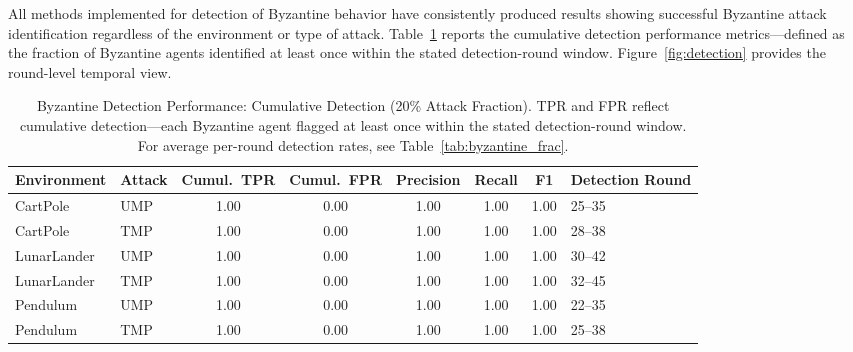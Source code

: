 \documentclass[12pt,a4paper]{article}
\begin{document}
All methods implemented for detection of Byzantine behavior have consistently produced
results showing successful Byzantine attack identification regardless of the environment
or type of attack. Table~\ref{tab:detection} reports the cumulative detection
performance metrics---defined as the fraction of Byzantine agents identified at least
once within the stated detection-round window. Figure~\ref{fig:detection} provides the
round-level temporal view.

\begin{table}[htbp]
\centering
\caption{Byzantine Detection Performance: Cumulative Detection (20\% Attack Fraction). TPR and FPR reflect cumulative detection---each Byzantine agent flagged at least once within the stated detection-round window. For average per-round detection rates, see Table~\ref{tab:byzantine_frac}.}
\label{tab:detection}
\begin{tabular}{llcccccl}
\toprule
\textbf{Environment} & \textbf{Attack} & \textbf{Cumul.\ TPR} & \textbf{Cumul.\ FPR} &
\textbf{Precision} & \textbf{Recall} & \textbf{F1} & \textbf{Detection Round} \\
\midrule
CartPole    & UMP & 1.00 & 0.00 & 1.00 & 1.00 & 1.00 & 25--35 \\
CartPole    & TMP & 1.00 & 0.00 & 1.00 & 1.00 & 1.00 & 28--38 \\
LunarLander & UMP & 1.00 & 0.00 & 1.00 & 1.00 & 1.00 & 30--42 \\
LunarLander & TMP & 1.00 & 0.00 & 1.00 & 1.00 & 1.00 & 32--45 \\
Pendulum    & UMP & 1.00 & 0.00 & 1.00 & 1.00 & 1.00 & 22--35 \\
Pendulum    & TMP & 1.00 & 0.00 & 1.00 & 1.00 & 1.00 & 25--38 \\
\bottomrule
\end{tabular}
\end{table}
\end{document}
